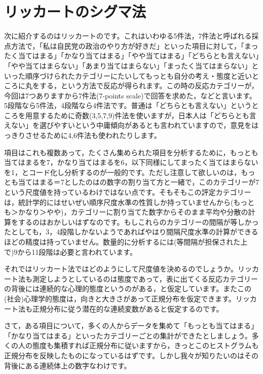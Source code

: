 \documentclass{ltjsbook}
\begin{document}
\section{リッカートのシグマ法}
\label{LikertScale}
次に紹介するのはリッカートのです。これはいわゆる5件法，7件法と呼ばれる採点方法で，「私は自民党の政治のやり方が好きだ」といった項目に対して，「まったく当てはまる」「かなり当てはまる」「やや当てはまる」「どちらとも言えない」「やや当てはまらない」「あまり当てはまらない」「まったく当てはまらない」といった順序づけられたカテゴリーにたいしてもっとも自分の考え・態度と近いところに丸をする，という方法で反応が得られます。この時の反応カテゴリーが，今回は7つありますから7件法(7-points scale)で回答を求めた，などと言います。5段階なら5件法，4段階なら4件法です。普通は「どちらとも言えない」というところを用意するために奇数(3,5,7,9)件法を使いますが，日本人は「どちらとも言えない」を選びやすいという中庸傾向があるとも言われていますので，意見をはっきりさせるために4,6件法も使われたりします。

項目はこれも複数あって，たくさん集められた項目を分析するために，もっとも当てはまるを7，かなり当てはまるを6，以下同様にしてまったく当てはまらないを1，とコード化し分析するのが一般的です。ただし注意して欲しいのは，もっとも当てはまる＝7としたのはの数字の割り当て方と一緒で，このカテゴリーが7という尺度値を持っているわけではない点です。そもそもこの評定カテゴリーは，統計学的にはせいぜい順序尺度水準の性質しか持っていませんから(もっとも＞かなり＞やや)，カテゴリーに割り当てた数字からそのまま平均や分散の計算をするのはおかしいはずなのです。もしこれらのカテゴリーの間隔が等しかったとしても，3，4段階しかないようであればやはり間隔尺度水準の計算ができるほどの精度は持っていません。数量的に分析するには(等間隔が担保された上で)9から11段階は必要と言われています。

それではリッカート法ではどのようにして尺度値を決めるのでしょうか。リッカート法も測定しようとしているのは態度であって，表に出てくる反応カテゴリーの背後には連続的な心理的態度というのがある，と仮定しています。またこの(社会)心理学的態度は，向きと大きさがあって正規分布を仮定できます。リッカート法も正規分布に従う潜在的な連続変数があると仮定するのです。

さて，ある項目について，多くの人からデータを集めて「もっとも当てはまる」「かなり当てはまる」といったカテゴリーごとの集計ができたとしましょう。多くの人の態度も集積すれば正規分布に従いますから，きっとこのヒストグラムも正規分布を反映したものになっているはずです。しかし我々が知りたいのはその背後にある連続体上の数字なわけです。
\end{document}
